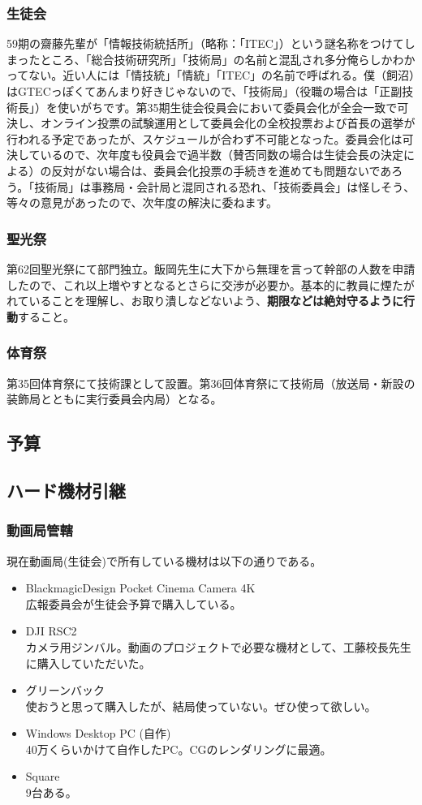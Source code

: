 \documentclass[dvipdfmx,jb5]{jarticle}
\begin{document}
\subsubsection{生徒会}
59期の齋藤先輩が「情報技術統括所」（略称：「ITEC」）という謎名称をつけてしまったところ、「総合技術研究所」「技術局」の名前と混乱され多分俺らしかわかってない。近い人には「情技統」「情統」「ITEC」の名前で呼ばれる。僕（飼沼）はGTECっぽくてあんまり好きじゃないので、「技術局」（役職の場合は「正副技術長」）を使いがちです。第35期生徒会役員会において委員会化が全会一致で可決し、オンライン投票の試験運用として委員会化の全校投票および首長の選挙が行われる予定であったが、スケジュールが合わず不可能となった。委員会化は可決しているので、次年度も役員会で過半数（賛否同数の場合は生徒会長の決定による）の反対がない場合は、委員会化投票の手続きを進めても問題ないであろう。「技術局」は事務局・会計局と混同される恐れ、「技術委員会」は怪しそう、等々の意見があったので、次年度の解決に委ねます。
\subsubsection{聖光祭}
第62回聖光祭にて部門独立。飯岡先生に大下から無理を言って幹部の人数を申請したので、これ以上増やすとなるとさらに交渉が必要か。基本的に教員に煙たがれていることを理解し、お取り潰しなどないよう、{\bf 期限などは絶対守るように行動}すること。
\subsubsection{体育祭}
第35回体育祭にて技術課として設置。第36回体育祭にて技術局（放送局・新設の装飾局とともに実行委員会内局）となる。

\subsection{予算}\label{sec:予算}
\subsection{ハード機材引継}
\subsubsection{動画局管轄}
 現在動画局(生徒会)で所有している機材は以下の通りである。
 \begin{itemize}
  \item BlackmagicDesign Pocket Cinema Camera 4K\\
  広報委員会が生徒会予算で購入している。
  \item DJI RSC2\\
  カメラ用ジンバル。動画のプロジェクトで必要な機材として、工藤校長先生に購入していただいた。
  \item グリーンバック\\
  使おうと思って購入したが、結局使っていない。ぜひ使って欲しい。
  \item Windows Desktop PC (自作)\\
 40万くらいかけて自作したPC。CGのレンダリングに最適。
  \item Square\\
  9台ある。
 \end{itemize}
\end{document}
